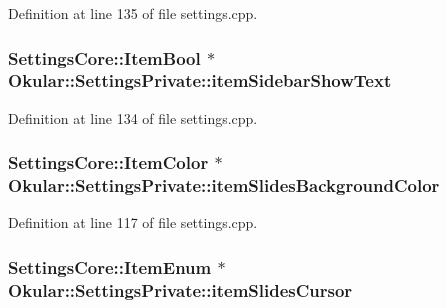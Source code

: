 Definition at line 135 of file settings.\+cpp.

\hypertarget{classOkular_1_1SettingsPrivate_ae1d4c31efa5f316584412c99d6e10bff}{
\subsubsection[{item\+Sidebar\+Show\+Text}]{\setlength{\rightskip}{0pt plus 5cm}Settings\+Core\+::\+Item\+Bool $\ast$ Okular\+::\+Settings\+Private\+::item\+Sidebar\+Show\+Text}}\label{classOkular_1_1SettingsPrivate_ae1d4c31efa5f316584412c99d6e10bff}


Definition at line 134 of file settings.\+cpp.

\hypertarget{classOkular_1_1SettingsPrivate_a2cfd2167d51655fece5c5e64633f82f6}{
\subsubsection[{item\+Slides\+Background\+Color}]{\setlength{\rightskip}{0pt plus 5cm}Settings\+Core\+::\+Item\+Color $\ast$ Okular\+::\+Settings\+Private\+::item\+Slides\+Background\+Color}}\label{classOkular_1_1SettingsPrivate_a2cfd2167d51655fece5c5e64633f82f6}


Definition at line 117 of file settings.\+cpp.

\hypertarget{classOkular_1_1SettingsPrivate_ad81b5a683ded63607aea2c7f64cab5d6}{
\subsubsection[{item\+Slides\+Cursor}]{\setlength{\rightskip}{0pt plus 5cm}Settings\+Core\+::\+Item\+Enum $\ast$ Okular\+::\+Settings\+Private\+::item\+Slides\+Cursor}}\label{classOkular_1_1SettingsPrivate_ad81b5a683ded63607aea2c7f64cab5d6}


